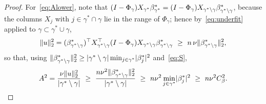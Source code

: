 \begin{proof}
    For~\eqref{eq:Alower}, note that
    $(I-\Phi_\gamma)X_{\gamma^{\ast}}\beta^{\ast}_{\gamma^{\ast}}=(I-\Phi_\gamma)
    X_{\gamma^{\ast}\setminus\gamma}
    \beta^\ast_{\gamma^{\ast}\setminus\gamma}$, because the columns $X_j$
    with $j\in\gamma^{\ast}\cap\gamma$ lie in the range of $\Phi_\gamma$;
    hence by~\eqref{eq:underfit} applied to
    $\gamma\subset\gamma^{\ast}\cup\gamma$,
    \begin{equation}
        \label{eq:usquare}
        \lVert u\rVert_2^{2}
        =(\beta^\ast_{\gamma^{\ast}\setminus\gamma})^{\top}
        X_{\gamma^{\ast}\setminus\gamma}^{\top}(I-\Phi_\gamma)
        X_{\gamma^{\ast}\setminus\gamma}
        \beta^\ast_{\gamma^{\ast}\setminus\gamma}
        \ \geq\ n\,\nu
        \lVert\beta^\ast_{\gamma^{\ast}\setminus\gamma}\rVert_2^{2},
    \end{equation}
    so that, using
    $\lVert\beta^\ast_{\gamma^{\ast}\setminus\gamma}\rVert_2^{2}
    \geq\lvert\gamma^{\ast}\setminus\gamma\rvert
    \min_{j\in\gamma^{\ast}}\lvert\beta^\ast_j\rvert^{2}$ and~\eqref{eq:S},
    \begin{equation}
        \label{eq:Achain}
        A^{2}=\frac{\nu\lVert u\rVert_2^{2}}
        {\lvert\gamma^{\ast}\setminus\gamma\rvert}
        \ \geq\ \frac{n\nu^{2}
            \lVert\beta^\ast_{\gamma^{\ast}\setminus\gamma}\rVert_2^{2}}
        {\lvert\gamma^{\ast}\setminus\gamma\rvert}
        \ \geq\ n\nu^{2}\min_{j\in\gamma^{\ast}}
        \lvert\beta^\ast_j\rvert^{2}
        \ \geq\ n\nu^{2}C_\beta^{2} .
    \end{equation}


\end{proof}
